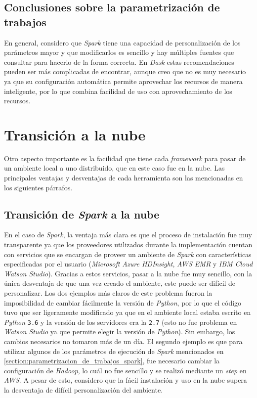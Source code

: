\subsection{Conclusiones sobre la parametrización de trabajos}

En general, considero que \textit{Spark} tiene una capacidad de personalización de los parámetros mayor y que modificarlos es sencillo y hay múltiples fuentes que consultar para hacerlo de la forma correcta. En \textit{Dask} estas recomendaciones pueden ser más complicadas de encontrar, aunque creo que no es muy necesario ya que su configuración automática permite aprovechar los recursos de manera inteligente, por lo que combina facilidad de uso con aprovechamiento de los recursos.

\section{Transición a la nube}

Otro aspecto importante es la facilidad que tiene cada \textit{framework} para pasar de un ambiente local a uno distribuido, que en este caso fue en la nube. Las principales ventajas y desventajas de cada herramienta son las mencionadas en los siguientes párrafos.

\subsection{Transición de \textit{Spark} a la nube}

En el caso de \textit{Spark}, la ventaja más clara es que el proceso de instalación fue muy transparente ya que los proveedores utilizados durante la implementación cuentan con servicios que se encargan de proveer un ambiente de \textit{Spark} con características especificadas por el usuario (\textit{Microsoft Azure HDInsight}, \textit{AWS EMR} y \textit{IBM Cloud Watson Studio}). Gracias a estos servicios, pasar a la nube fue muy sencillo, con la única desventaja de que una vez creado el ambiente, este puede ser difícil de personalizar. Los dos ejemplos más claros de este problema fueron la imposibilidad de cambiar fácilmente la versión de \textit{Python}, por lo que el código tuvo que ser ligeramente modificado ya que en el ambiente local estaba escrito en \textit{Python} \texttt{3.6} y la versión de los servidores era la \texttt{2.7} (esto no fue problema en \textit{Watson Studio} ya que permite elegir la versión de \textit{Python}). Sin embargo, los cambios necesarios no tomaron más de un día. El segundo ejemplo es que para utilizar algunos de los parámetros de ejecución de \textit{Spark} mencionados en \ref{section:parametrizacion_de_trabajos_spark}, fue necesario cambiar la configuración de \textit{Hadoop}, lo cuál no fue sencillo y se realizó mediante un \textit{step} en \textit{AWS}. A pesar de esto, considero que la fácil instalación y uso en la nube supera la desventaja de difícil personalización del ambiente.

